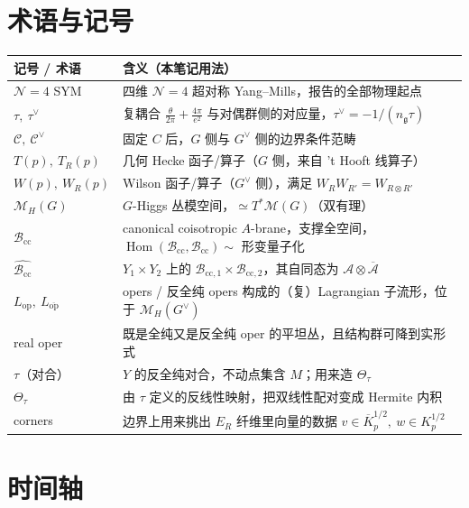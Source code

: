 \documentclass[11pt,a4paper]{ctexart}
\newcommand{\Bcc}{\mathcal{B}_{\mathrm{cc}}}
\newcommand{\Loc}{\mathcal{M}_H}
\newcommand{\op}{\mathrm{op}}
\newcommand{\opb}{\overline{\mathrm{op}}}
\newcommand{\Hom}{\operatorname{Hom}}
\begin{document}
\section{术语与记号}

\begin{center}\small
\begin{tabular}{@{}p{4.6cm}p{10.6cm}@{}}
\toprule
记号 / 术语 & 含义（本笔记用法）\\
\midrule
$\mathcal{N}=4$ SYM & 四维 $\mathcal{N}=4$ 超对称 Yang–Mills，报告的全部物理起点\\
$\tau,\ \tau^{\vee}$ & 复耦合 $\frac{\theta}{2\pi}+\frac{4\pi}{e^2}$ 与对偶群侧的对应量，$\tau^\vee=-1/(n_{\mathfrak{g}}\tau)$\\
$\mathcal{C},\ \mathcal{C}^{\vee}$ & 固定 $C$ 后，$G$ 侧与 $G^{\vee}$ 侧的边界条件范畴\\
$T(p),\ T_R(p)$ & 几何 Hecke 函子/算子（$G$ 侧，来自 't Hooft 线算子）\\
$W(p),\ W_R(p)$ & Wilson 函子/算子（$G^{\vee}$ 侧），满足 $W_RW_{R'}=W_{R\otimes R'}$\\
$\Loc(G)$ & $G$-Higgs 丛模空间，$\simeq T^*\mathcal{M}(G)$（双有理）\\
$\Bcc$ & canonical coisotropic $A$-brane，支撑全空间，$\Hom(\Bcc,\Bcc)\sim$ 形变量子化\\
$\widehat{\Bcc}$ & $Y_1\times Y_2$ 上的 $\mathcal{B}_{\mathrm{cc},1}\times\mathcal{B}_{\mathrm{cc},2}$，其自同态为 $\mathcal{A}\otimes\overline{\mathcal{A}}$\\
$L_{\op},\ L_{\opb}$ & opers / 反全纯 opers 构成的（复）Lagrangian 子流形，位于 $\Loc(G^{\vee})$\\
real oper & 既是全纯又是反全纯 oper 的平坦丛，且结构群可降到实形式\\
$\tau$（对合） & $Y$ 的反全纯对合，不动点集含 $M$；用来造 $\Theta_\tau$\\
$\Theta_\tau$ & 由 $\tau$ 定义的反线性映射，把双线性配对变成 Hermite 内积\\
corners & 边界上用来挑出 $E_R$ 纤维里向量的数据 $v\in\overline{K}^{1/2}_p,\ w\in K^{1/2}_p$\\
\bottomrule
\end{tabular}
\end{center}

\section{时间轴}
\end{document}

